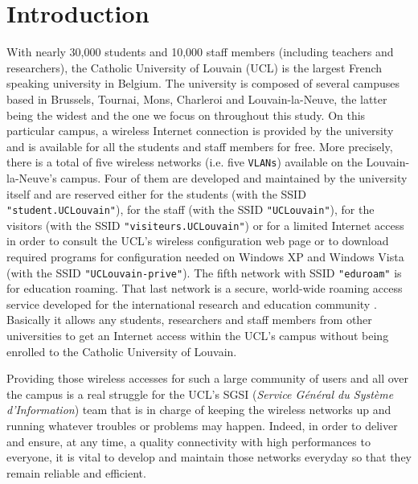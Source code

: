 
\chapter{Introduction} %

\label{Chapter1} %


With nearly 30,000 students and 10,000 staff members (including teachers and researchers), the Catholic University of Louvain (UCL) is the largest French speaking university in Belgium. The university is composed of several campuses based in Brussels, Tournai, Mons, Charleroi and Louvain-la-Neuve, the latter being the widest and the one we focus on throughout this study. On this particular campus, a wireless Internet connection is provided by the university and is available for all the students and staff members for free. More precisely, there is a total of five wireless networks (i.e. five \texttt{VLANs}) available on the Louvain-la-Neuve's campus. Four of them are developed and maintained by the university itself and are reserved either for the students (with the SSID \texttt{"student.UCLouvain"}), for the staff (with the SSID \texttt{"UCLouvain"}), for the visitors (with the SSID \texttt{"visiteurs.UCLouvain"}) or for a limited Internet access in order to consult the UCL's wireless configuration web page or to download required programs for configuration needed on Windows XP and Windows Vista (with the SSID \texttt{"UCLouvain-prive"}). The fifth network with SSID \texttt{"eduroam"} is for education roaming. That last network is a secure, world-wide roaming access service developed for the international research and education community \cite{eduroam1}. Basically it allows any students, researchers and staff members from other universities to get an Internet access within the UCL's campus without being enrolled to the Catholic University of Louvain.

Providing those wireless accesses for such a large community of users and all over the campus is a real struggle for the UCL's SGSI (\textit{Service Général du Système d'Information}) team that is in charge of keeping the wireless networks up and running whatever troubles or problems may happen. Indeed, in order to deliver and ensure, at any time, a quality connectivity with high performances to everyone, it is vital to develop and maintain those networks everyday so that they remain reliable and efficient.
 
